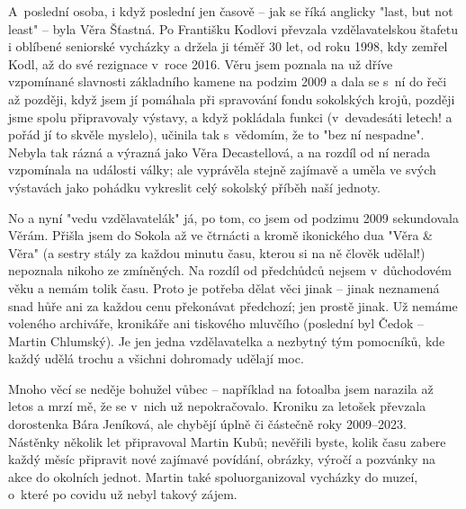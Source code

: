 \documentclass[11pt]{article}
\begin{document}
A~poslední osoba, i když poslední jen časově –⁠⁠⁠⁠⁠⁠ jak se říká anglicky "last, but not least" –⁠⁠⁠⁠⁠⁠ byla Věra Šťastná. Po Františku Kodlovi převzala vzdělavatelskou štafetu i oblíbené seniorské vycházky a držela ji téměř 30 let, od roku 1998, kdy zemřel Kodl, až do své rezignace v~roce 2016. Věru jsem poznala na už dříve vzpomínané slavnosti základního kamene na podzim 2009 a dala se s~ní do řeči až později, když jsem jí pomáhala při spravování fondu sokolských krojů, později jsme spolu připravovaly výstavy, a když pokládala funkci (v~devadesáti letech! a pořád jí to skvěle myslelo), učinila tak s~vědomím, že to "bez ní nespadne". Nebyla tak rázná a výrazná jako Věra Decastellová, a na rozdíl od ní nerada vzpomínala na události války; ale vyprávěla stejně zajímavě a uměla ve svých výstavách jako pohádku vykreslit celý sokolský příběh naší jednoty. 

No a nyní "vedu vzdělavatelák" já, po tom, co jsem od podzimu 2009 sekundovala Věrám. Přišla jsem do Sokola až ve čtrnácti a kromě ikonického dua "Věra \& Věra" (a sestry stály za každou minutu času, kterou si na ně člověk udělal!) nepoznala nikoho ze zmíněných. Na rozdíl od předchůdců nejsem v~důchodovém věku a nemám tolik času. Proto je potřeba dělat věci jinak – jinak neznamená snad hůře ani za každou cenu překonávat předchozí; jen prostě jinak. Už nemáme voleného archiváře, kronikáře ani tiskového mluvčího (poslední byl Čedok – Martin Chlumský). Je jen jedna vzdělavatelka a nezbytný tým pomocníků, kde každý udělá trochu a všichni dohromady udělají moc. 

Mnoho věcí se neděje bohužel vůbec – například na fotoalba jsem narazila až letos a mrzí mě, že se v~nich už nepokračovalo. Kroniku za letošek převzala dorostenka Bára Jeníková, ale chybějí úplně či částečně roky 2009–2023. Nástěnky několik let připravoval Martin Kubů; nevěřili byste, kolik času zabere každý měsíc připravit nové zajímavé povídání, obrázky, výročí a pozvánky na akce do okolních jednot. Martin také spoluorganizoval vycházky do muzeí, o~které po covidu už nebyl takový zájem.
\end{document}
